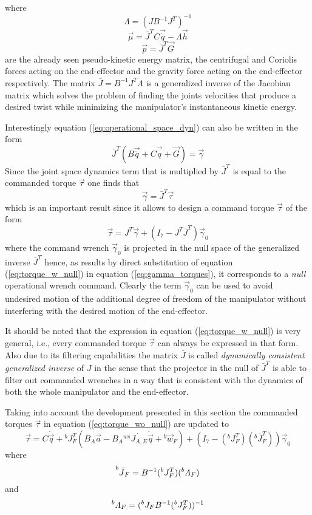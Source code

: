 where
\[
\Lambda = (J B^{-1} J^{T})^{-1}
\]
\[
\vec{\mu} = \bar{J}^{T} C \vec{\dot{q}} - \Lambda \vec{h}
\]
\[
\vec{p} = \bar{J}^T \vec{G}
\]
are the already seen pseudo-kinetic energy matrix, the centrifugal and
Coriolis forces acting on the end-effector and the gravity force acting on the end-effector
respectively.
The matrix $\bar{J} = B^{-1} J^{T} \Lambda$ is a generalized inverse of the Jacobian matrix
which solves the problem of finding the joints velocities that produce a desired twist
while minimizing the manipulator's instantaneous kinetic energy.
\par
Interestingly equation (\ref{eq:operational_space_dyn}) can also be written in the form
\[
\bar{J}^{T} (B \vec{\ddot{q}} + C \vec{\dot{q}} + \vec{G}) = \vec{\gamma}
\]
Since the joint space dynamics term that is multiplied by $\bar{J}^{T}$ is equal to the
commanded torque $\vec{\tau}$ one finds that
\begin{equation}\label{eq:gamma_torques}
  \vec{\gamma} = \bar{J}^{T} \vec{\tau}
\end{equation}
which is an important result since it allows to design a command torque $\vec{\tau}$ of the form
\begin{equation}\label{eq:torque_w_null}
  \vec{\tau} = J^{T} \vec{\gamma} + (I_7 - J^{T}\bar{J}^{T}) \vec{\gamma}_{0}
\end{equation}
where the command wrench $\vec{\gamma}_{0}$ is projected in the null space of the
generalized inverse $\bar{J}^{T}$ hence, as results by direct substitution of equation
(\ref{eq:torque_w_null}) in equation (\ref{eq:gamma_torques}), it corresponds
to a \emph{null} operational wrench command. Clearly the term $\vec{\gamma}_{0}$ can
be used to avoid undesired motion of the additional degree of freedom of the manipulator
without interfering with the desired motion of the end-effector.
\par
It should be noted that the expression in equation (\ref{eq:torque_w_null}) is very general, i.e.,
every commanded torque $\vec{\tau}$ can always be expressed in that form.
Also due to its filtering capabilities the matrix $\bar{J}$ is called \emph{dynamically consistent generalized inverse} 
of $J$ in the sense that the projector in the null of $\bar{J}^T$ is able 
to filter out commanded wrenches in a way that is consistent with the dynamics of both the
whole manipulator and the end-effector.
\par
Taking into account the development presented in this section the commanded torques $\vec{\tau}$
in equation (\ref{eq:torque_wo_null}) are updated to
\begin{equation}\label{eq:torqu_w_null_1}
  \vec{\tau} = C \dot{\vec{q}} + {}^{b}J^{T}_{F} ( B_A \vec{a} - B_A {}^{ws} \dot{J_{A,E}} \dot{\vec{q}} + {}^b\vec{w}_{F}) +
  (I_7 - ({}^{b}J^{T}_{F}) ({}^{b} \bar{J}^{T}_{F})) \vec{\gamma}_{0}
\end{equation}
where
\[
\prescript{b}{}{\bar{J}}_{F} = B^{-1} ({}^{b} J^{T}_{F}) ({}^{b} \Lambda_{F})
\]
and
\[
\prescript{b}{}{\Lambda}_{F} = ({}^{b} J_{F} B^{-1} ({}^{b} J^{T}_{F}))^{-1}
\]

